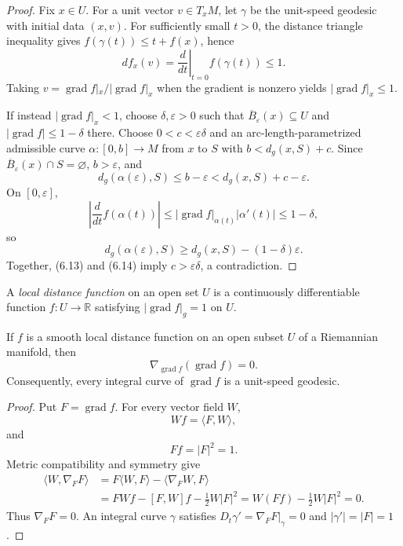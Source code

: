 \begin{proof}
\sketch Fix $x\in U$. For a unit vector $v\in T_xM$, let $\gamma$ be the
unit-speed geodesic with initial data $(x,v)$. For sufficiently small $t>0$,
the distance triangle inequality gives
$f(\gamma(t))\leq t+f(x)$, hence
\[
df_x(v)=\left.\frac d{dt}\right|_{t=0}f(\gamma(t))\leq1.
\]
Taking $v=\operatorname{grad}f|_x/|\operatorname{grad}f|_x$ when the gradient
is nonzero yields $|\operatorname{grad}f|_x\leq1$.

If instead $|\operatorname{grad}f|_x<1$, choose $\delta,\varepsilon>0$ such
that $\overline B_\varepsilon(x)\subseteq U$ and
$|\operatorname{grad}f|\leq1-\delta$ there. Choose
$0<c<\varepsilon\delta$ and an arc-length-parametrized admissible curve
$\alpha:[0,b]\to M$ from $x$ to $S$ with
$b<d_g(x,S)+c$. Since $\overline B_\varepsilon(x)\cap S=\varnothing$,
$b>\varepsilon$, and
\begin{equation}
d_g(\alpha(\varepsilon),S)
\leq b-\varepsilon<d_g(x,S)+c-\varepsilon.
\tag{6.13}
\end{equation}
On $[0,\varepsilon]$,
\[
\left|\frac d{dt}f(\alpha(t))\right|
\leq|\operatorname{grad}f|_{\alpha(t)}|\alpha'(t)|\leq1-\delta,
\]
so
\begin{equation}
d_g(\alpha(\varepsilon),S)
\geq d_g(x,S)-(1-\delta)\varepsilon.
\tag{6.14}
\end{equation}
Together, (6.13) and (6.14) imply $c>\varepsilon\delta$, a contradiction.
\end{proof}

A \emph{local distance function} on an open set $U$ is a continuously
differentiable function $f:U\to\mathbb R$ satisfying
$|\operatorname{grad}f|_g=1$ on $U$.

\begin{theorem}
\label{thm:local-distance-geodesic-integral-curve}

If $f$ is a smooth local distance function on an open subset $U$ of a
Riemannian manifold, then
\[
\nabla_{\operatorname{grad}f}(\operatorname{grad}f)=0.
\]
Consequently, every integral curve of $\operatorname{grad}f$ is a unit-speed
geodesic.
\end{theorem}

\begin{proof}
\sketch Put $F=\operatorname{grad}f$. For every vector field $W$,
\begin{equation}
Wf=\langle F,W\rangle,
\tag{6.15}
\end{equation}
and
\begin{equation}
Ff=|F|^2=1.
\tag{6.16}
\end{equation}
Metric compatibility and symmetry give
\begin{align*}
\langle W,\nabla_FF\rangle
&=F\langle W,F\rangle-\langle\nabla_FW,F\rangle\\
&=FWf-[F,W]f-\tfrac12W|F|^2
=W(Ff)-\tfrac12W|F|^2=0.
\end{align*}
Thus $\nabla_FF=0$. An integral curve $\gamma$ satisfies
$D_t\gamma'=\nabla_FF|_\gamma=0$ and $|\gamma'|=|F|=1$.
\end{proof}

